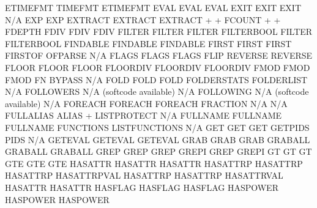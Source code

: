 \documentclass[letterpaper,10pt,english]{sphinxmanual}
\begin{document}
\begin{sphinxVerbatim}[commandchars=\\\{\}]
ETIMEFMT                TIMEFMT                      ETIMEFMT
EVAL                    EVAL                         EVAL
EXIT                    EXIT                         EXIT
N/A                     EXP                          EXP
EXTRACT                 EXTRACT                      EXTRACT
\PYGZpc{}+                      \PYGZpc{}+                           FCOUNT
\PYGZpc{}+                      \PYGZpc{}+                           FDEPTH
FDIV                    FDIV                         FDIV
FILTER                  FILTER                       FILTER
FILTERBOOL              FILTER                       FILTERBOOL
FINDABLE                FINDABLE                     FINDABLE
FIRST                   FIRST                        FIRST
FIRSTOF                 OFPARSE                      N/A
FLAGS                   FLAGS                        FLAGS
FLIP                    REVERSE                      REVERSE
FLOOR                   FLOOR                        FLOOR
FLOORDIV                FLOORDIV                     FLOORDIV
FMOD                    FMOD                         FMOD
FN                      BYPASS                       N/A
FOLD                    FOLD                         FOLD
FOLDERSTATS             FOLDERLIST                   N/A
FOLLOWERS               N/A (softcode available)     N/A
FOLLOWING               N/A (softcode available)     N/A
FOREACH                 FOREACH                      FOREACH
FRACTION                N/A                          N/A
FULLALIAS               ALIAS + LISTPROTECT          N/A
FULLNAME                FULLNAME                     FULLNAME
FUNCTIONS               LISTFUNCTIONS                N/A
GET                     GET                          GET
GETPIDS                 PIDS                         N/A
GET\PYGZus{}EVAL                GET\PYGZus{}EVAL                     GET\PYGZus{}EVAL
GRAB                    GRAB                         GRAB
GRABALL                 GRABALL                      GRABALL
GREP                    GREP                         GREP
GREPI                   GREP                         GREPI
GT                      GT                           GT
GTE                     GTE                          GTE
HASATTR                 HASATTR                      HASATTR
HASATTRP                HASATTRP                     HASATTRP
HASATTRPVAL             HASATTRP                     HASATTRP
HASATTRVAL              HASATTR                      HASATTR
HASFLAG                 HASFLAG                      HASFLAG
HASPOWER                HASPOWER                     HASPOWER

\end{sphinxVerbatim}
\end{document}
